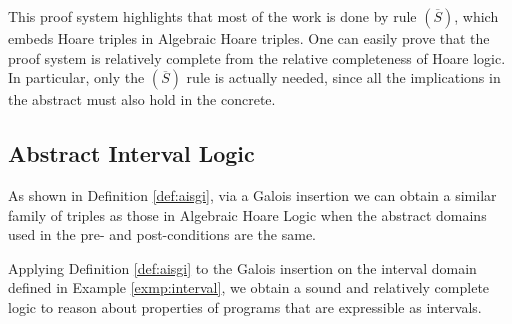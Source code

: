 This proof system highlights that most of the work is done by rule
$(\overline{S})$, which embeds Hoare triples in Algebraic Hoare triples. One can
easily prove that the proof system is relatively complete from the relative
completeness of Hoare logic. In particular, only the $(\overline{S})$ rule is
actually needed, since all the implications in the abstract must also hold in
the concrete.

\subsection{Abstract Interval Logic} As shown in Definition \ref{def:aisgi}, via 
a Galois insertion we can obtain a similar family of triples as those in 
Algebraic Hoare Logic when the abstract domains used in the pre- and 
post-conditions are the same.

\begin{example}
  \label{exmp:int-logic}
  Applying Definition \ref{def:aisgi} to the Galois insertion on the interval
  domain defined in Example \ref{exmp:interval}, we obtain a sound and
  relatively complete logic to reason about properties of programs that are
  expressible as intervals.
\end{example}

